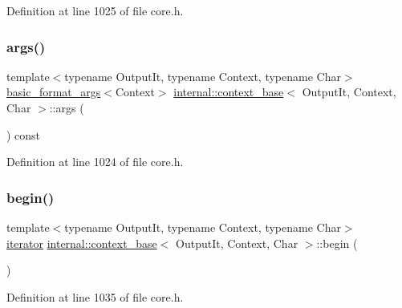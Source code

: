 Definition at line 1025 of file core.\+h.

\mbox{\label{classinternal_1_1context__base_a2dffc62b4cf30e9a359c1c85827c8c43}} 
\subsubsection{\texorpdfstring{args()}{args()}}
{\footnotesize\ttfamily template$<$typename Output\+It, typename Context, typename Char$>$ \\
\hyperlink{classbasic__format__args}{basic\+\_\+format\+\_\+args}$<$Context$>$ \hyperlink{classinternal_1_1context__base}{internal\+::context\+\_\+base}$<$ Output\+It, Context, Char $>$\+::args (\begin{DoxyParamCaption}{ }\end{DoxyParamCaption}) const\hspace{0.3cm}{\ttfamily [inline]}}



Definition at line 1024 of file core.\+h.

\mbox{\label{classinternal_1_1context__base_a9de5734a58ca81e3fadf0a01c78acfa5}} 
\subsubsection{\texorpdfstring{begin()}{begin()}}
{\footnotesize\ttfamily template$<$typename Output\+It, typename Context, typename Char$>$ \\
\hyperlink{classinternal_1_1context__base_a6486e3c9656c10eb99a4731fb169e51b}{iterator} \hyperlink{classinternal_1_1context__base}{internal\+::context\+\_\+base}$<$ Output\+It, Context, Char $>$\+::begin (\begin{DoxyParamCaption}{ }\end{DoxyParamCaption})\hspace{0.3cm}{\ttfamily [inline]}}



Definition at line 1035 of file core.\+h.

\mbox{\label{classinternal_1_1context__base_aba7fbe1704fbe9409fce1aa51e75e0f1}} 
